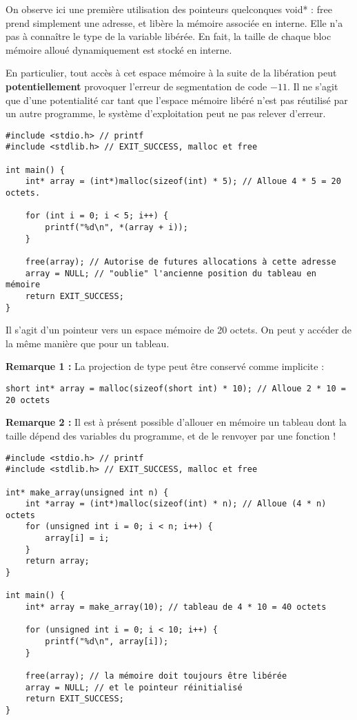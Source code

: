 \documentclass[../../../main.tex]{subfiles}
\begin{document}
On observe ici une première utilisation des pointeurs quelconques \textsf{void*} : \textsf{free} prend simplement une adresse, et libère la mémoire associée en interne. Elle n'a pas à connaître le type de la variable libérée. En fait, la taille de chaque bloc mémoire alloué dynamiquement est stocké en interne.

En particulier, tout accès à cet espace mémoire à la suite de la libération peut \textbf{potentiellement} provoquer l'erreur de segmentation de code $-11$. Il ne s'agit que d'une potentialité car tant que l'espace mémoire libéré n'est pas réutilisé par un autre programme, le système d'exploitation peut ne pas relever d'erreur.
\begin{verbatim}
#include <stdio.h> // printf
#include <stdlib.h> // EXIT_SUCCESS, malloc et free

int main() {
	int* array = (int*)malloc(sizeof(int) * 5); // Alloue 4 * 5 = 20 octets.

	for (int i = 0; i < 5; i++) {
		printf("%d\n", *(array + i));
	}

	free(array); // Autorise de futures allocations à cette adresse
	array = NULL; // "oublie" l'ancienne position du tableau en mémoire
	return EXIT_SUCCESS;
}
\end{verbatim}
Il s'agit d'un pointeur vers un espace mémoire de 20 octets. On peut y accéder de la même manière que pour un tableau.
 
\textbf{Remarque 1 :} La projection de type peut être conservé comme implicite :
\begin{verbatim}
short int* array = malloc(sizeof(short int) * 10); // Alloue 2 * 10 = 20 octets
\end{verbatim}
\textbf{Remarque 2 :} Il est à présent possible d'allouer en mémoire un tableau dont la taille dépend des variables du programme, et de le renvoyer par une fonction !
\begin{verbatim}
#include <stdio.h> // printf
#include <stdlib.h> // EXIT_SUCCESS, malloc et free

int* make_array(unsigned int n) {
	int *array = (int*)malloc(sizeof(int) * n); // Alloue (4 * n) octets
	for (unsigned int i = 0; i < n; i++) {
		array[i] = i;
	}
	return array;
}

int main() {
	int* array = make_array(10); //	tableau de 4 * 10 = 40 octets

	for (unsigned int i = 0; i < 10; i++) {
		printf("%d\n", array[i]);
	}

	free(array); // la mémoire doit toujours être libérée
	array = NULL; // et le pointeur réinitialisé
	return EXIT_SUCCESS;
}
\end{verbatim}
\end{document}
